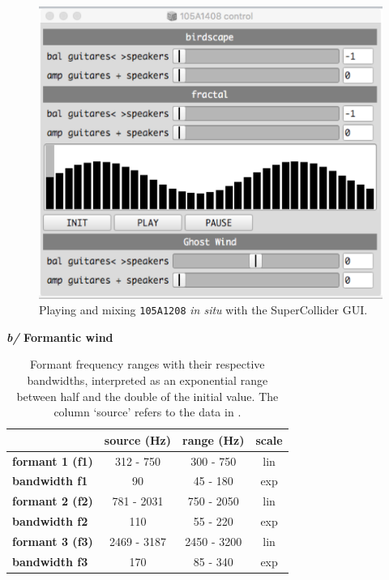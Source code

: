 \begin{figure}[h!]
\begin{center}
	\includegraphics[scale=0.45]{img/9809}		
\caption{Playing and mixing \texttt{105A1208} \textit{in situ} with the SuperCollider GUI.}
\label{hk}
\end{center}
\end{figure}

  \textbf{\textit{b/} Formantic wind}
  
  \smallskip 
  
  \begin{table}[H]
\begin{center}
{\ttfamily
\begin{tabular}{|l|c|c|c|}
\cline{2-4}
    \multicolumn{1}{c|}{} & \textbf{source (Hz)} & \textbf{range (Hz)} & \textbf{scale} \\ 
    \hline 
    \textbf{formant 1 (f1)} & 312 - 750 & 300 - 750 & lin \\ 
 \hline
 \textbf{bandwidth f1} & 90 & 45 - 180 & exp \\ 
 \hline
 \textbf{formant 2 (f2)} & 781 - 2031 & 750 - 2050 & lin \\ 
 \hline
 \textbf{bandwidth f2} & 110 & 55 - 220 & exp \\ 
 \hline
 \textbf{formant 3 (f3)} & 2469 - 3187 & 2450 - 3200 & lin \\ 
 \hline
 \textbf{bandwidth f3} & 170 & 85 - 340 & exp \\ 
 \hline
\end{tabular}}
\caption{Formant frequency ranges with their respective bandwidths, interpreted as an exponential range between half and the double of the initial value. The column `source' refers to the data in \citep{adc}.}
\end{center}
\label{default}
\end{table}%

	
	
	
	
